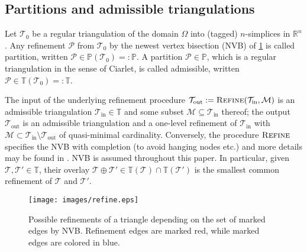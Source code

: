 \documentclass{siamltex1213}
\begin{document}
\subsection{Partitions and admissible triangulations}
Let ${\mathcal T_{0}}$ be a regular triangulation of the domain $\Omega$ into (tagged) $n$-simplices in $\mathbb R^n$. 
Any refinement ${\mathcal{P}}$ from ${\mathcal T_{0}}$ by the newest vertex bisection (NVB) of \cref{fig:refine} is called partition, written ${\mathcal{P}}\in{\mathbb P\left({{\mathcal T_{0}}}\right)}=:{\mathbb P}$. A partition ${\mathcal{P}} \in {\mathbb P}$, which is a regular triangulation in the sense of Ciarlet, is called admissible, written ${\mathcal{P}}\in {\mathbb T\left({{\mathcal T_{0}}}\right)}=:{\mathbb T}$.

The input of the underlying refinement procedure 
${\mathcal T_{{\text{out}}}}:=\textsc{Refine}({\mathcal T_{{\text{in}}}},{\mathcal{M}})$ is an admissible triangulation  ${\mathcal T_{{\text{in}}}}\in {\mathbb T}$ and some subset
${\mathcal{M}}\subseteq{\mathcal T_{{\text{in}}}}$  thereof; the output ${\mathcal T_{{\text{out}}}}$ is an admissible triangulation and a one-level refinement of ${\mathcal T_{{\text{in}}}}$ with 
${\mathcal{M}}\subset{\mathcal T_{{\text{in}}}}\setminus{\mathcal T_{{\text{out}}}}$ of quasi-minimal cardinality. Conversely, the procedure $\textsc{Refine}$ specifies 
the NVB with completion (to avoid hanging nodes etc.) and more details may be found in \cite{Stev08}. NVB is assumed throughout this paper. In particular, given ${\mathcal{T}},{\mathcal{T}}'\in{\mathbb T}$, their overlay ${\mathcal{T}}\oplus{\mathcal{T}}' \in {\mathbb T\left({\mathcal{T}}\right)} \cap {\mathbb T\left({{\mathcal{T}}'}\right)}$ is the smallest common 
refinement of ${\mathcal{T}}$ and ${\mathcal{T}}'$.

\begin{figure}
	\begin{center}
	\texttt{[image: images/refine.eps]}
	\end{center}
		\caption{Possible refinements of a triangle depending on the set of marked edges by NVB. Refinement edges are marked red, while marked edges are colored in blue.}
	\label{fig:refine}
\end{figure}
\end{document}
